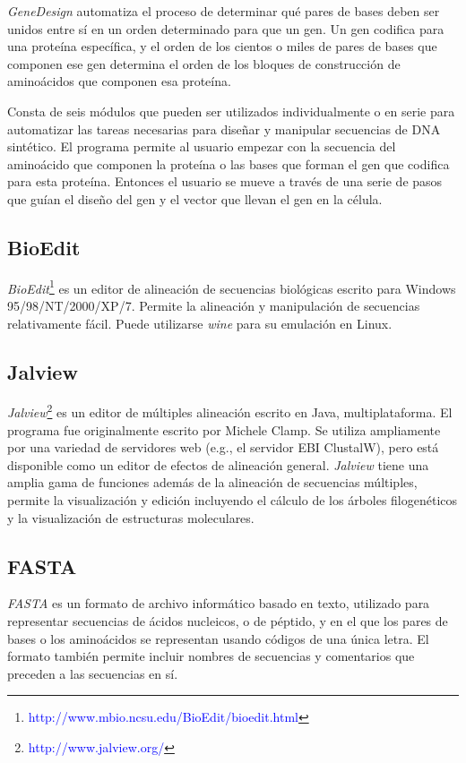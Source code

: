 \documentclass[12pt,a4paper,spanish]{article}
\begin{document}
		\par \emph{GeneDesign} automatiza el proceso de determinar qué pares de bases deben ser unidos entre sí en un 			orden determinado para que un gen. Un gen codifica para una proteína específica, y el orden de los cientos o miles 			de pares de bases que componen ese gen determina el orden de los bloques de construcción de aminoácidos que 		componen esa proteína. 

		\par Consta de seis módulos que pueden ser utilizados individualmente o en serie para automatizar las tareas 			necesarias para diseñar y manipular secuencias de DNA sintético. El programa permite al usuario empezar con la 			secuencia del aminoácido que componen la proteína o las bases que forman el gen que codifica para esta proteína. 			Entonces el usuario se mueve a través de una serie de pasos que guían el diseño del gen y el vector que llevan el 			gen en la célula. 

	\subsection{BioEdit}		

		\par \textit{BioEdit}\footnote{\textcolor{blue}{http://www.mbio.ncsu.edu/BioEdit/bioedit.html}} es un editor de 		alineación de secuencias biológicas escrito para Windows 95/98/NT/2000/XP/7. Permite la alineación y manipulación 			de secuencias relativamente fácil. Puede utilizarse \textit{wine} para su emulación en Linux.

	\subsection{Jalview}
		\par \textit{Jalview}\footnote{\textcolor{blue}{http://www.jalview.org/}} es un editor de múltiples alineación 			escrito en Java, multiplataforma. El programa fue originalmente escrito por Michele Clamp. Se utiliza ampliamente 			por una variedad de servidores web (e.g., el servidor EBI ClustalW), pero está disponible como un editor 			de efectos de alineación general. \textit{Jalview} tiene una amplia gama de funciones además de la alineación de 			secuencias múltiples, permite la visualización y edición incluyendo el cálculo de los árboles filogenéticos y la 			visualización de estructuras moleculares. 

	\subsection{FASTA}
		\par \textit{FASTA} \cite{1} es un formato de archivo informático basado en texto, utilizado para representar 			secuencias de ácidos nucleicos, o de péptido, y en el que los pares de bases o los aminoácidos se representan 			usando códigos de una única letra. El formato también permite incluir nombres de secuencias y comentarios que 			preceden a las secuencias en sí.	
\end{document}
